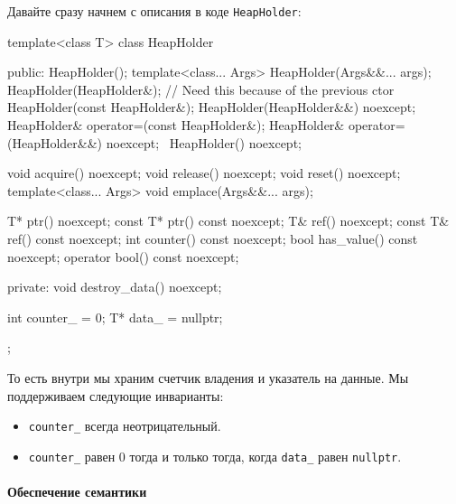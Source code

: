 Давайте сразу начнем с описания в коде \verb"HeapHolder":
\begin{cppcode}
template<class T>
class HeapHolder {
public:
  HeapHolder();
  template<class... Args>
  HeapHolder(Args&&... args);
  HeapHolder(HeapHolder&); // Need this because of the previous ctor
  HeapHolder(const HeapHolder&);
  HeapHolder(HeapHolder&&) noexcept;
  HeapHolder& operator=(const HeapHolder&);
  HeapHolder& operator=(HeapHolder&&) noexcept;
  ~HeapHolder() noexcept;

  void acquire() noexcept;
  void release() noexcept;
  void reset() noexcept;
  template<class... Args>
  void emplace(Args&&... args);
  
  T* ptr() noexcept;
  const T* ptr() const noexcept;
  T& ref() noexcept;
  const T& ref() const noexcept;
  int counter() const noexcept;
  bool has_value() const noexcept;
  operator bool() const noexcept;

private:
  void destroy_data() noexcept;
  
  int counter_ = 0;
  T* data_ = nullptr;
};
\end{cppcode}
То есть внутри мы храним счетчик владения и указатель на данные.
Мы поддерживаем следующие инварианты:
\begin{itemize}
\item \verb"counter_" всегда неотрицательный.

\item \verb"counter_" равен $0$ тогда и только тогда, когда \verb"data_" равен \verb"nullptr".
\end{itemize}

\paragraph{Обеспечение семантики}

